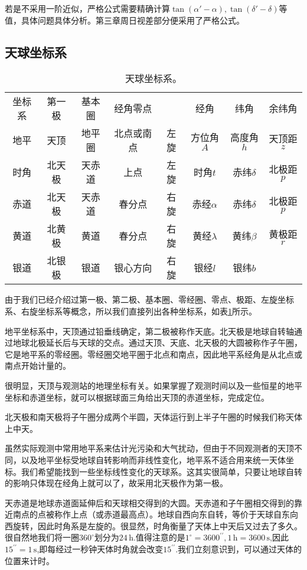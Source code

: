 \documentclass[11pt, a4paper, oneside]{ctexart}
\numberwithin{equation}{subsection}
\begin{document}
若是不采用一阶近似，严格公式需要精确计算$\tan\left(\alpha'-\alpha\right),\tan\left(\delta{}'-\delta{}\right)$等值，具体问题具体分析。第三章周日视差部分便采用了严格公式。

\subsection{天球坐标系}
\begin{table}[htbp]
\centering
\caption{天球坐标系。}
\begin{tabular}{c c c c c c c c}
\hline
坐标系 & 第一极 & 基本圈 & 经角零点 &  & 经角 & 纬角 & 余纬角\\
\cline{1-8}
地平 & 天顶 & 地平圈 & 北点或南点 & 左旋 & 方位角$A$ & 高度角$h$ & 天顶距$z$\\
\cline{1-8}
时角 & 北天极 & 天赤道 & 上点 & 左旋 & 时角$t$ & 赤纬$\delta{}$ & 北极距$p$\\
\cline{1-8}
赤道 & 北天极 & 天赤道 & 春分点 & 右旋 & 赤经$\alpha$ & 赤纬$\delta{}$ & 北极距$p$\\
\cline{1-8}
黄道 & 北黄极 & 黄道 & 春分点 & 右旋 & 黄经$\lambda$ & 黄纬$\beta$ & 黄极距$r$\\
\cline{1-8}
银道 & 北银极 & 银道 & 银心方向 & 右旋 & 银经$l$ & 银纬$b$ & \\
\cline{1-8}
\end{tabular}
\label{天球坐标系。}
\end{table}

由于我们已经介绍过第一极、第二极、基本圈、零经圈、零点、极距、左旋坐标系、右旋坐标系等概念，所以我们直接列出各种坐标系，如表\ref{天球坐标系。}所示。

地平坐标系中，天顶通过铅垂线确定，第二极被称作天底。北天极是地球自转轴通过地球北极延长后与天球的交点。通过天顶、天底、北天极的大圆被称作子午圈，它是地平系的零经圈。零经圈交地平圈于北点和南点，因此地平系经角是从北点或南点开始计量的。

很明显，天顶与观测站的地理坐标有关。如果掌握了观测时间以及一些恒星的地平坐标和赤道坐标，就可以根据球面三角给出天顶的赤道坐标，完成定位。

\newpage
北天极和南天极将子午圈分成两个半圆，天体运行到上半子午圈的时候我们称天体上中天。

虽然实际观测中常用地平系来估计光污染和大气扰动，但由于不同观测者的天顶不同，以及地平坐标受地球自转影响而非线性变化，地平系不适合用来统一天体坐标。我们希望能找到一些坐标线性变化的天球系。这其实很简单，只要让地球自转的影响只体现在经角上就可以了，故采用北天极作为第一极。

天赤道是地球赤道面延伸后和天球相交得到的大圆。天赤道和子午圈相交得到的靠近南点的点被称作上点（或赤道最高点）。地球自西向东自转，等价于天球自东向西旋转，因此时角系是左旋的。很显然，时角衡量了天体上中天后又过去了多久。很自然地我们将一圈$360^{\circ}$划分为$24\,\mathrm{h}$.值得注意的是$1^{\circ}=3600^{\prime\prime},1\,\mathrm{h}=3600\,\mathrm{s}$,因此$15^{\prime\prime}=1\,\mathrm{s}$,即每经过一秒钟天体时角就会改变$15^{\prime\prime}$.我们立刻意识到，可以通过天体的位置来计时。
\end{document}
